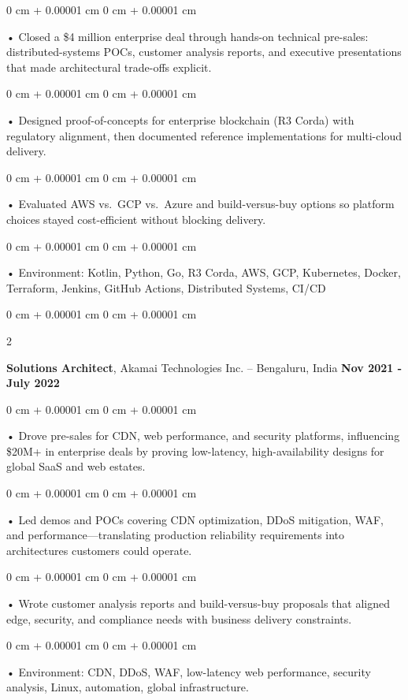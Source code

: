 \documentclass[10pt, letterpaper]{article}
\newenvironment{onecolentry}{
    \begin{adjustwidth}{
        0 cm + 0.00001 cm
    }{
        0 cm + 0.00001 cm
    }
}{
    \end{adjustwidth}
} %
\newenvironment{twocolentry}[2][]{
    \onecolentry
    \def\secondColumn{#2}
    \setcolumnwidth{\fill, 4.5 cm}
    \begin{paracol}{2}
}{
    \switchcolumn \raggedleft \secondColumn
    \end{paracol}
    \endonecolentry
} %
\begin{document}
        \begin{onecolentry}
             • Closed a \$4 million enterprise deal through hands-on technical pre-sales: distributed-systems POCs, customer analysis reports, and executive presentations that made architectural trade-offs explicit.
        \end{onecolentry}
        \begin{onecolentry}
             • Designed proof-of-concepts for enterprise blockchain (R3 Corda) with regulatory alignment, then documented reference implementations for multi-cloud delivery.
        \end{onecolentry}
        \begin{onecolentry}
             • Evaluated AWS vs.\ GCP vs.\ Azure and build-versus-buy options so platform choices stayed cost-efficient without blocking delivery.
        \end{onecolentry}
        \begin{onecolentry}
             • Environment: Kotlin, Python, Go, R3 Corda, AWS, GCP, Kubernetes, Docker, Terraform, Jenkins, GitHub Actions, Distributed Systems, CI/CD
        \end{onecolentry}
        \vspace{0.1cm}

        \begin{twocolentry}{
            \textbf{Nov 2021 - July 2022}
        }
            \textbf{Solutions Architect}, Akamai Technologies Inc. -- Bengaluru, India \end{twocolentry}
        \begin{onecolentry}
            • Drove pre-sales for CDN, web performance, and security platforms, influencing \$20M+ in enterprise deals by proving low-latency, high-availability designs for global SaaS and web estates.
        \end{onecolentry}
        \begin{onecolentry}
            • Led demos and POCs covering CDN optimization, DDoS mitigation, WAF, and performance---translating production reliability requirements into architectures customers could operate.
        \end{onecolentry}
        \begin{onecolentry}
             • Wrote customer analysis reports and build-versus-buy proposals that aligned edge, security, and compliance needs with business delivery constraints.
        \end{onecolentry}
        \begin{onecolentry}
             • Environment: CDN, DDoS, WAF, low-latency web performance, security analysis, Linux, automation, global infrastructure.
        \end{onecolentry}
\end{document}
